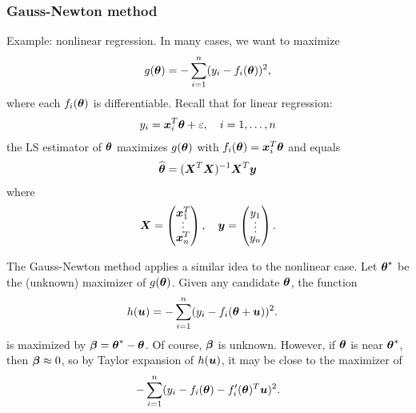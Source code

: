   \begin{frame}
  \frametitle{Gauss-Newton method}
  \noindent Example: nonlinear regression.
  In many cases, we want to maximize
  \begin{align*}
    g(\boldsymbol{\theta}) = - \sum_{i=1}^n (y_i - f_i(\boldsymbol{\theta}))^2,
  \end{align*}
  where each $f_i(\boldsymbol{\theta})$ is differentiable.
  Recall that for linear regression:
  \begin{align*}
    y_i = \boldsymbol{x}_i\sp{T} \boldsymbol{\theta} + \varepsilon, \quad i=1,\ldots,n
  \end{align*}
  the LS estimator of $\boldsymbol{\theta}$ maximizes $g(\boldsymbol{\theta})$ with
  $f_i(\boldsymbol{\theta}) = \boldsymbol{x}_i\sp{T}\boldsymbol{\theta}$ and equals
  \begin{align*}
    \widehat{\boldsymbol{\theta}} = (\boldsymbol{X}\sp{T}\boldsymbol{X})^{-1} \boldsymbol{X}\sp{T}\boldsymbol{y}
  \end{align*}
  where
  \begin{align*}
    \boldsymbol{X} = \begin{pmatrix}
      \boldsymbol{x}_1\sp{T} \\[-1ex] \vdots \\[-1ex] \boldsymbol{x}_n\sp{T}
    \end{pmatrix},
    \quad
    \boldsymbol{y} =
    \begin{pmatrix}
      y_1 \\[-1ex] \vdots \\[-1ex] y_n
    \end{pmatrix}.
  \end{align*}

  \end{frame}

  \begin{frame}
  The Gauss-Newton method applies a similar idea to the nonlinear
  case.  Let $\boldsymbol{\theta}^*$ be the (unknown) maximizer of
  $g(\boldsymbol{\theta})$.
  Given any candidate $\boldsymbol{\theta}$, the function
  \begin{align*}
    h(\boldsymbol{u}) &= - \sum_{i=1}^n (y_i - f_i(\boldsymbol{\theta}+\boldsymbol{u}))^2.
  \end{align*}
  is maximized by $\boldsymbol{\beta} = \boldsymbol{\theta}^* -
  \boldsymbol{\theta}$.  Of course, $\boldsymbol{\beta}$ is unknown.  However, if
  $\boldsymbol{\theta}$ is near $\boldsymbol{\theta}^*$, then $\boldsymbol{\beta}\approx 0$, so by
  Taylor expansion of $h(\boldsymbol{u})$, it may be close to the maximizer of
  \begin{align*}
    - \sum_{i=1}^n (y_i - f_i(\boldsymbol{\theta}) - f_i'(\boldsymbol{\theta})\sp{T}
    \boldsymbol{u})^2.
  \end{align*}

\end{frame}

